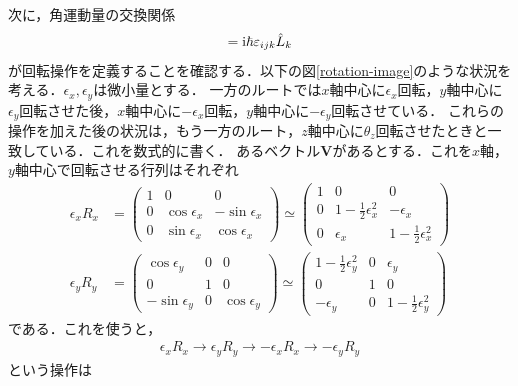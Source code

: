 \documentclass{report}
\begin{document}
  次に，角運動量の交換関係
  \begin{align}
    [\hat{L}_i, \hat{L}_j] = \i\hbar\epsilon_{ijk} \hat{L}_k \label{commutation-of-am}
  \end{align}
  が回転操作を定義することを確認する．以下の図\ref{rotation-image}のような状況を考える．$\epsilon_x,\epsilon_y$は微小量とする．
  一方のルートでは$x$軸中心に$\epsilon_x$回転，$y$軸中心に$\epsilon_y$回転させた後，$x$軸中心に$-\epsilon_x$回転，$y$軸中心に$-\epsilon_y$回転させている．
  これらの操作を加えた後の状況は，もう一方のルート，$z$軸中心に$\theta_z$回転させたときと一致している．これを数式的に書く．
  あるベクトル$\bm{V}$があるとする．これを$x$軸，$y$軸中心で回転させる行列はそれぞれ
  \begin{align}
    \epsilon_x R_x &=
    \begin{pmatrix}
      1 & 0 & 0\\
      0 & \cos\epsilon_x & -\sin\epsilon_x\\
      0 & \sin\epsilon_x & \cos\epsilon_x
    \end{pmatrix}
    \simeq
    \begin{pmatrix}
      1 & 0 & 0\\
      0 & 1 - \frac{1}{2}\epsilon_x^2 & -\epsilon_x\\
      0 & \epsilon_x & 1 - \frac{1}{2}\epsilon_x^2
    \end{pmatrix}\\
    \epsilon_y R_y &=
    \begin{pmatrix}
      \cos\epsilon_y & 0 & 0\\
      0 & 1 & 0\\
      -\sin\epsilon_y & 0 & \cos\epsilon_y
    \end{pmatrix}
    \simeq
    \begin{pmatrix}
      1 - \frac{1}{2}\epsilon_y^2 & 0 & \epsilon_y\\
      0 & 1 & 0\\
      -\epsilon_y & 0 & 1 - \frac{1}{2}\epsilon_y^2
    \end{pmatrix}
  \end{align}
  である．これを使うと，
  \begin{align}
    \epsilon_xR_x \to \epsilon_y R_y \to -\epsilon_x R_x \to -\epsilon_yR_y
  \end{align}
  という操作は
\end{document}

